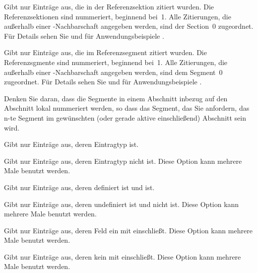 \documentclass{ltxdockit}[2011/03/25]
\begin{document}
\begin{optionlist*}

Gibt nur Einträge aus, die in der Referenzsektion  zitiert wurden.
Die Referenzsektionen sind nummeriert, beginnend bei~1. Alle Zitierungen, die
außerhalb einer -Nachbarschaft angegeben werden, sind der
Section~0 zugeordnet. Für Details sehen Sie  und für
Anwendungsbeispiele .


Gibt nur Einträge aus, die im Referenzsegment  zitiert wurden. Die
Referenzsgmente sind nummeriert, beginnend bei~1. Alle Zitierungen, die außerhalb
einer -Nachbarschaft angegeben werden, sind dem Segment~0
zugeordnet. Für Details sehen Sie  und für
Anwendungsbeispiele . 

Denken Sie daran, dass die Segmente in einem Abschnitt inbezug auf den Abschnitt lokal nummeriert werden, so dass das Segment, das Sie anfordern, das n-te Segment im gewünschten (oder gerade aktive einschließend) Abschnitt sein wird.


Gibt nur Einträge aus, deren Eintragtyp  ist. 


Gibt nur Einträge aus, deren Eintragtyp nicht  ist. Diese Option
kann mehrere Male benutzt werden.   


Gibt nur Einträge aus, deren  definiert ist und
 ist.


Gibt nur Einträge aus, deren  undefiniert ist und nicht
 ist. Diese Option kann mehrere Male benutzt werden.   


Gibt nur Einträge aus, deren  Feld ein  mit
einschließt. Diese Option kann mehrere Male benutzt werden.  


Gibt nur Einträge aus, deren  kein  mit
einschließt. Diese Option kann mehrere Male benutzt werden.   



\end{optionlist*}
\end{document}
